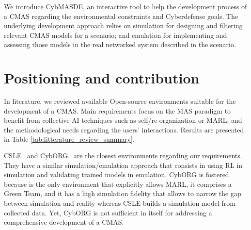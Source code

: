 \documentclass[sigconf]{aamas}
\begin{document}

We introduce CybMASDE, an interactive tool to help the development process of a CMAS regarding the environmental constraints and Cyberdefense goals. The underlying development approach relies on simulation for designing and filtering relevant CMAS models for a scenario; and emulation for implementing and assessing those models in the real networked system described in the scenario.





\section{Positioning and contribution}

In literature, we reviewed available Open-source environments suitable for the development of a CMAS. Main requirements focus on the MAS paradigm to benefit from collective AI techniques such as self/re-organization or MARL; and the methodological needs regarding the users' interactions. Results are presented in Table \ref{tab:litterature_review_summary}.

CSLE~\cite{Hammar2022} and CybORG~\cite{Maxwell2021} are the closest environments regarding our requirements. They have a similar simulation/emulation approach that consists in using RL in simulation and validating trained models in emulation. CybORG is fostered because is the only environment that explicitly allows MARL, it comprises a Green Team, and it has a high simulation fidelity that allows to narrow the gap between simulation and reality whereas CSLE builds a simulation model from collected data. Yet, CybORG is not sufficient in itself for addressing a comprehensive development of a CMAS.
\end{document}
